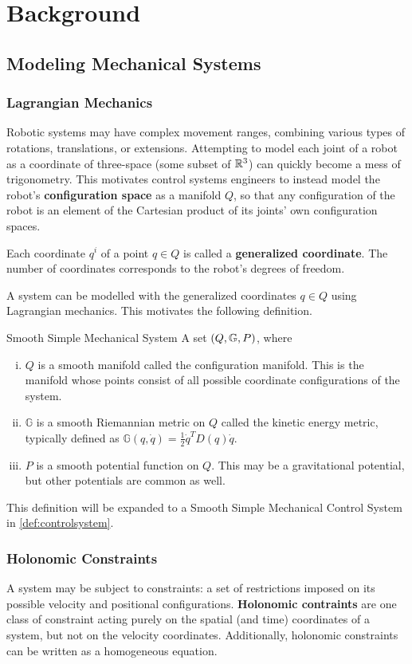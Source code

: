 \documentclass[main.tex]{subfiles}
\begin{document}
\chapter{Background}
\section{Modeling Mechanical Systems}
\subsection{Lagrangian Mechanics}
Robotic systems may have complex movement ranges, combining various types of rotations, translations, or extensions. Attempting to model each joint of a robot as a coordinate of three-space (some subset of $\mathbb{R}^3$) can quickly become a mess of trigonometry. This motivates control systems engineers to instead model the robot's \textbf{configuration space} as a manifold $Q$, so that any configuration of the robot is an element of the Cartesian product of its joints' own configuration spaces.

Each coordinate $q^i$ of a point $q\in Q$ is called a \textbf{generalized coordinate}. The number of coordinates corresponds to the robot's degrees of freedom.

A system can be modelled with the generalized coordinates $q\in Q$ using Lagrangian mechanics. This motivates the following definition.
\begin{boxdef}{Smooth Simple Mechanical System \cite{bullo2019geometric}}
A set $\del{Q,\mathbb{G},P}$, where
\begin{enumerate}[i.]
    \item $Q$ is a smooth manifold called the configuration manifold. This is the manifold whose points consist of all possible coordinate configurations of the system.
    \item $\mathbb{G}$ is a smooth Riemannian metric on $Q$ called the kinetic energy metric, typically defined as $\mathbb{G}(q,\dot q)=\frac{1}{2}\dot q^T D(q) \dot q$.
    \item $P$ is a smooth potential function on $Q$. This may be a gravitational potential, but other potentials are common as well.
\end{enumerate}
\end{boxdef}\label{def:system}
This definition will be expanded to a Smooth Simple Mechanical Control System in \ref{def:controlsystem}.

\subsection{Holonomic Constraints}
A system may be subject to constraints:
a set of restrictions imposed on its possible velocity and positional configurations. 
\textbf{Holonomic contraints} are one class of constraint acting purely on the spatial (and time) coordinates of a system, but not on the velocity coordinates. Additionally, holonomic constraints can be written as a homogeneous equation.
\end{document}

